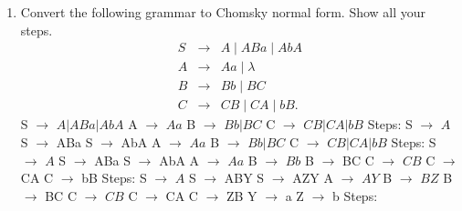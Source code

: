 \documentclass{article}
\begin{document}
\begin{enumerate}
\item Convert the following grammar to Chomsky normal form. Show all
  your steps. 
     \begin{eqnarray*}
      S &\rightarrow& A \mid ABa \mid AbA \\
      A &\rightarrow& Aa \mid \lambda\\
      B &\rightarrow& Bb \mid BC\\
      C &\rightarrow& CB \mid CA \mid bB.
     \end{eqnarray*}
  \newline S $\rightarrow$ $A|ABa|AbA$
  \newline A $\rightarrow$ $Aa$
  \newline B $\rightarrow$ $Bb|BC$
  \newline C $\rightarrow$ $CB|CA|bB$
  \newline
  \newline Steps:
  \newline S $\rightarrow$ $A$
  \newline S $\rightarrow$ ABa
  \newline S $\rightarrow$ AbA
  \newline A $\rightarrow$ $Aa$
  \newline B $\rightarrow$ $Bb|BC$
  \newline C $\rightarrow$ $CB|CA|bB$
  \newline 
  \newline Steps:
  \newline S $\rightarrow$ $A$
  \newline S $\rightarrow$ ABa
  \newline S $\rightarrow$ AbA
  \newline A $\rightarrow$ $Aa$
  \newline B $\rightarrow$ $Bb$
  \newline B $\rightarrow$ BC
  \newline C $\rightarrow$ $CB$
  \newline C $\rightarrow$ CA
  \newline C $\rightarrow$ bB
  \newline 
  \newline Steps:
  \newline S $\rightarrow$ $A$
  \newline S $\rightarrow$ ABY
  \newline S $\rightarrow$ AZY
  \newline A $\rightarrow$ $AY$
  \newline B $\rightarrow$ $BZ$
  \newline B $\rightarrow$ BC
  \newline C $\rightarrow$ $CB$
  \newline C $\rightarrow$ CA
  \newline C $\rightarrow$ ZB
  \newline Y $\rightarrow$ a
  \newline Z $\rightarrow$ b
  \newline Steps:
  

\end{enumerate}
\end{document}
